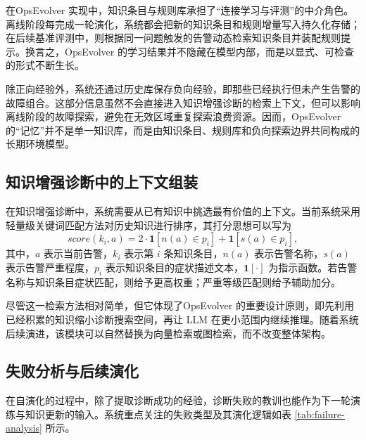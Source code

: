 在OpsEvolver 实现中，知识条目与规则库承担了“连接学习与评测”的中介角色。离线阶段每完成一轮演化，系统都会把新的知识条目和规则增量写入持久化存储；在后续基准评测中，则根据同一问题触发的告警动态检索知识条目并装配规则提示。换言之，OpsEvolver 的学习结果并不隐藏在模型内部，而是以显式、可检查的形式不断生长。

除正向经验外，系统还通过历史库保存负向经验，即那些已经执行但未产生告警的故障组合。这部分信息虽然不会直接进入知识增强诊断的检索上下文，但可以影响离线阶段的故障探索，避免在无效区域重复探索浪费资源。因而，OpsEvolver 的“记忆”并不是单一知识库，而是由知识条目、规则库和负向探索边界共同构成的长期环境模型。

\subsection{知识增强诊断中的上下文组装}

在知识增强诊断中，系统需要从已有知识中挑选最有价值的上下文。当前系统采用轻量级关键词匹配方法对历史知识进行排序，其打分思想可以写为
\begin{equation}
    \label{eq:retrieval-score}
    score(k_i, a)=2 \cdot \mathbf{1}[n(a)\in p_i]+\mathbf{1}[s(a)\in p_i],
\end{equation}
其中，$a$ 表示当前告警，$k_i$ 表示第 $i$ 条知识条目，$n(a)$ 表示告警名称，$s(a)$ 表示告警严重程度，$p_i$ 表示知识条目的症状描述文本，$\mathbf{1}[\cdot]$ 为指示函数。若告警名称与知识条目症状匹配，则给予更高权重；严重等级匹配则给予辅助加分。

尽管这一检索方法相对简单，但它体现了OpsEvolver 的重要设计原则，即先利用已经积累的知识缩小诊断搜索空间，再让 LLM 在更小范围内继续推理。随着系统后续演进，该模块可以自然替换为向量检索或图检索，而不改变整体架构。

\subsection{失败分析与后续演化}

在自演化的过程中，除了提取诊断成功的经验，诊断失败的教训也能作为下一轮演练与知识更新的输入。系统重点关注的失败类型及其演化逻辑如表 \ref{tab:failure-analysis} 所示。


